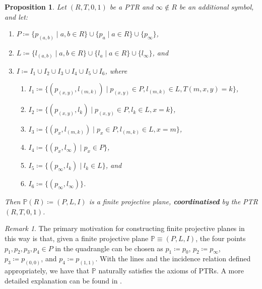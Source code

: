 \documentclass{report}
\renewcommand{\P}{\mathbb{P}}
\newtheorem{proposition}[theorem]{Proposition}
\theoremstyle{definition}\newtheorem*{definition}{Definition}
\theoremstyle{definition}\newtheorem*{example}{Example}
\theoremstyle{remark}\newtheorem*{remark}{Remark}
\begin{document}
\begin{proposition}
\label{prop:ptrplane}
Let $ (R, T, 0, 1) $ be a PTR and $ \infty \notin R $ be an additional symbol, and let:
\begin{enumerate}
  \item $ P \coloneqq \{ p_{(a, b)} \mid a, b \in R \} \cup \{ p_a \mid a \in R \} \cup \{ p_\infty \} $,
  \item $ L \coloneqq \{ l_{(a, b)} \mid a, b \in R \} \cup \{ l_a \mid a \in R \} \cup \{ l_\infty \} $, and
  \item $ I \coloneqq I_1 \cup I_2 \cup I_3 \cup I_4 \cup I_5 \cup I_6 $, where
    \begin{enumerate}
      \item $ I_1 \coloneqq \{ (p_{(x, y)}, l_{(m, k)}) \mid p_{(x, y)} \in P, l_{(m, k)} \in L, T(m, x, y) = k \} $,
      \item $ I_2 \coloneqq \{ (p_{(x, y)}, l_k) \mid p_{(x, y)} \in P, l_k \in L, x = k \} $,
      \item $ I_3 \coloneqq \{ (p_x, l_{(m, k)}) \mid p_x \in P, l_{(m, k)} \in L, x = m \} $,
      \item $ I_4 \coloneqq \{ (p_x, l_\infty) \mid p_x \in P \} $,
      \item $ I_5 \coloneqq \{ (p_\infty, l_k) \mid l_k \in L \} $, and
      \item $ I_6 \coloneqq \{ (p_\infty, l_\infty) \} $.
    \end{enumerate}
\end{enumerate}
Then $ \P(R) \coloneqq (P, L, I) $ is a finite projective plane, \textbf{coordinatised} by the PTR $ (R, T, 0, 1) $.
\end{proposition}

\begin{remark}
The primary motivation for constructing finite projective planes in this way is that, given a finite projective plane $ \P \equiv (P, L, I) $, the four points $ p_1, p_2, p_3, p_4 \in P $ in the quadrangle can be chosen as $ p_1 \coloneqq p_0 $, $ p_2 \coloneqq p_\infty $, $ p_3 \coloneqq p_{(0, 0)} $, and $ p_4 \coloneqq p_{(1, 1)} $. With the lines and the incidence relation defined appropriately, we have that $ \P $ naturally satisfies the axioms of PTRs. A more detailed explanation can be found in \cite{5}.
\end{remark}
\end{document}

